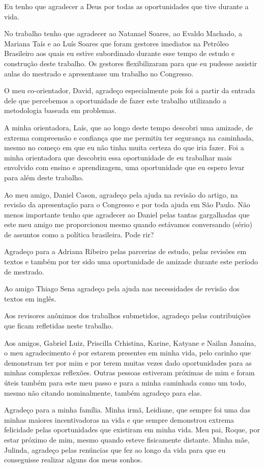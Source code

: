 \acknowledgements
Eu tenho que agradecer a Deus por todas as oportunidades
que tive durante a vida.

No trabalho tenho que agradecer ao Natanael Soares,
ao Evaldo Machado, a Mariana Taís e ao Luís Soares que
foram gestores imediatos na Petróleo Brasileiro aos quais
eu estive subordinado durante esse tempo de estudo e
construção deste trabalho.
Os gestores flexibilizaram para que eu pudesse
assistir aulas do mestrado e apresentasse
um trabalho no Congresso.

O meu co-orientador, David, agradeço especialmente
pois foi a partir da entrada dele que percebemos
a oportunidade de fazer este trabalho utilizando a
metodologia baseada em problemas.

A minha orientadora, Laís, que ao longo deste tempo descobri
uma amizade, de extrema compreensão e confiança
que me permitiu ter segurança na caminhada, mesmo no
começo em que eu não tinha muita certeza do que iria
fazer.
Foi a minha orientadora que descobriu essa oportunidade
de eu trabalhar mais envolvido com ensino e aprendizagem,
uma oportunidade que eu espero levar para
além deste trabalho.

Ao meu amigo, Daniel Cason, agradeço pela ajuda na
revisão do artigo, na revisão da apresentação
para o Congresso e por toda ajuda em São Paulo.
Não menos importante tenho que agradecer ao Daniel
pelas tantas gargalhadas que este meu amigo me
proporcionou mesmo quando estávamos conversando
(sério) de assuntos como a política brasileira.
Pode rir?

Agradeço para a Adriana Ribeiro pelas parcerias
de estudo, pelas revisões em textos e também
por ter sido uma oportunidade de amizade durante
este período de mestrado.

Ao amigo Thiago Sena agradeço pela ajuda
nas necessidades de revisão dos textos em
inglês.

Aos revisores anônimos dos trabalhos submetidos,
agradeço pelas contribuições que ficam
refletidas neste trabalho.

Aos amigos, Gabriel Luiz, Priscilla Crhistina,
Karine, Katyane e Nailan Janaína, o
meu agradecimento é por estarem presentes
em minha vida, pelo carinho que demonstram ter
por mim e por terem muitas vezes dado
oportunidades para as minhas complexas
reflexões.
Outras pessoas estiveram próximas de mim e
foram úteis também para este meu passo e para
a minha caminhada como um todo, mesmo não citando
nominalmente, também agradeço para elas.

Agradeço para a minha família.
Minha irmã, Leidiane, que sempre foi uma das minhas
maiores incentivadoras na vida e que sempre
demonstrou extrema felicidade pelas oportunidades
que existiram em minha vida.
Meu pai, Roque, por estar próximo de mim,
mesmo quando esteve fisicamente distante.
Minha mãe, Julinda, agradeço pelas renúncias que
fez ao longo da vida para que eu conseguisse realizar
alguns dos meus sonhos.
